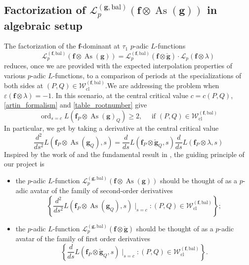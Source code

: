 \documentclass[10pt]{amsart}
\makeatletter
\numberwithin{equation}{section}
\newcommand{\mylabel}[2]{#2\def\@currentlabel{#2}\label{#1}}
\theoremstyle{definition}
\theoremstyle{remark} %
\newcommand{\scr}{\mathscr}
\newcommand{\mrm}{\mathrm}
\newcommand{\As}{\operatorname{As}}
\renewcommand{\b}{\mathrm{bal}}
\newcommand{\f}{\mathbf{f}}
\newcommand{\g}{\mathbf{g}}
\newcommand{\W}{\mathcal{W}}
\makeatother
\begin{document}
	\subsection{Factorization of $\scr{L}^{(\g,\b)}_p(\f \otimes \As(\g))$ in algebraic setup}
	\label{rank1_scenarion}
	The factorization of the $ \f $-dominant at $ \tau_1 $ $ p $-adic $ L $-functions
	\begin{equation}
		\label{f-dominant_factorization}
		\mathscr{L}_p^{(\f,\b)}(\f \otimes \As(\g) )  = \mathscr{L}_p^{(\f,\b)}(\f \otimes \breve{\g} )\cdot \mathscr{L}_p(\f \otimes \lambda)
	\end{equation}
	reduces, once we are provided with the expected interpolation properties of various $ p $-adic $ L $-functions, to a comparison of periods at the specializations of both sides at $ (P,Q) \in \W_{\mrm{cl}}^{(\f,\b)} $.We are addressing the problem when $ \varepsilon(\f \otimes \lambda) = -1$. In this scenario, at the central critical value $ c = c(P,Q) $, \eqref{artin_formalism} and \eqref{table_rootnumber} give 
	\begin{equation*}
		\operatorname{ord}_{s=c}L(\f_P \otimes \As(\g)_Q) \ge 2, \quad \text{ if } (P,Q) \in \W_{\mrm{cl}}^{(\f,\b)}
	\end{equation*}
	In particular, we get by taking a derivative at the central critical value
	\begin{equation}
		\frac{d^2}{ds^2}	L(\f_P \otimes  \operatorname{As}(\g_Q),s) =\frac{d}{ds} L(\f_P \otimes \breve{\g}_Q ,s)\frac{d}{ds} L(\f_P \otimes \lambda, s )
	\end{equation}
	Inspired by the work of \cite{BCS23} and the fundamental result in \cite{BDP13,DR22,BSV22b}, the guiding principle of our project is
	\begin{itemize}
		\item[ \mylabel{BDP1}{\textbf{(BDP1)}}] the $p$-adic $L$-function $\scr{L}^{(\g,\b)}_p(\f \otimes \As(\g))$ should be thought of as a $p$-adic avatar of the family of second-order derivatives 
		$$ \left\lbrace 	\frac{d^2}{ds^2}	L(\f_P \otimes  \operatorname{As}(\g_Q),s)\mid_{s=c} \colon (P,Q) \in \W_{\mrm{cl}}^{(\f,\b)} \right\rbrace ; $$ 
		\item[ \mylabel{BDP2}{\textbf{(BDP2)}}] the $p$-adic $L$-function $\scr{L}^{(\g,\b)}_p(\f \otimes \breve{\g})$ should be thought of as a $p$-adic avatar of the family of first order derivatives 
		$$ \left\lbrace \frac{d}{ds} L(\f_P \otimes \breve{\g}_Q ,s)\mid_{s=c} \colon (P,Q) \in \W_{\mrm{cl}}^{(\f,\b)} \right\rbrace . $$
	\end{itemize}
\end{document}
